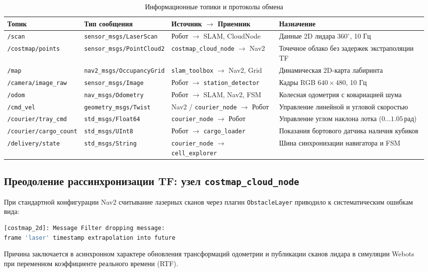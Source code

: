 \documentclass[a4paper,11pt]{article}
\begin{document}
\begin{table}[htbp]
\centering
\small
\begin{tabularx}{\textwidth}{p{3.6cm}p{4.6cm}p{3.2cm}X}
\toprule
\textbf{Топик} & \textbf{Тип сообщения} & \textbf{Источник $\to$ Приемник} & \textbf{Назначение} \\
\midrule
\texttt{/scan} & \texttt{sensor\_msgs/LaserScan} & Робот $\to$ SLAM, CloudNode & Данные 2D лидара $360^\circ$, 10 Гц \\
\texttt{/costmap/points} & \texttt{sensor\_msgs/PointCloud2} & \texttt{costmap\_cloud\_node} $\to$ Nav2 & Точечное облако без задержек экстраполяции TF \\
\texttt{/map} & \texttt{nav2\_msgs/OccupancyGrid} & \texttt{slam\_toolbox} $\to$ Nav2, Grid & Динамическая 2D-карта лабиринта \\
\texttt{/camera/image\_raw} & \texttt{sensor\_msgs/Image} & Робот $\to$ \texttt{station\_detector} & Кадры RGB $640 \times 480$, 10 Гц \\
\texttt{/odom} & \texttt{nav\_msgs/Odometry} & Робот $\to$ SLAM, Nav2, FSM & Колесная одометрия с ковариацией шума \\
\texttt{/cmd\_vel} & \texttt{geometry\_msgs/Twist} & Nav2 / \texttt{courier\_node} $\to$ Робот & Управление линейной и угловой скоростью \\
\texttt{/courier/tray\_cmd} & \texttt{std\_msgs/Float64} & \texttt{courier\_node} $\to$ Робот & Управление углом наклона лотка ($0\dots1.05$\,рад) \\
\texttt{/courier/cargo\_count} & \texttt{std\_msgs/UInt8} & Робот $\to$ \texttt{cargo\_loader} & Показания бортового датчика наличия кубиков \\
\texttt{/delivery/state} & \texttt{std\_msgs/String} & \texttt{courier\_node} $\to$ \texttt{cell\_explorer} & Шина синхронизации навигатора и FSM \\
\bottomrule
\end{tabularx}
\caption{Информационные топики и протоколы обмена}
\label{tab:ros2_topics}
\end{table}

\subsection{Преодоление рассинхронизации TF: узел \texttt{costmap\_cloud\_node}}
При стандартной конфигурации Nav2 считывание лазерных сканов через плагин \texttt{ObstacleLayer} приводило к систематическим ошибкам вида:
\begin{lstlisting}[language=bash]
[costmap_2d]: Message Filter dropping message:
frame 'laser' timestamp extrapolation into future
\end{lstlisting}
Причина заключается в асинхронном характере обновления трансформаций одометрии и публикации сканов лидара в симуляции Webots при переменном коэффициенте реального времени (RTF). 
\end{document}
